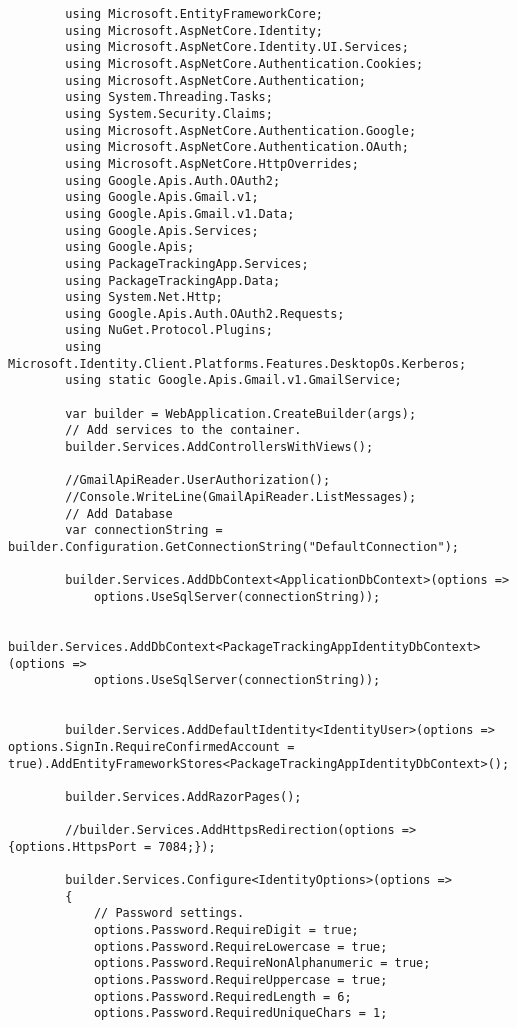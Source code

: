 \begin{verbatim}
        using Microsoft.EntityFrameworkCore;
        using Microsoft.AspNetCore.Identity;
        using Microsoft.AspNetCore.Identity.UI.Services;
        using Microsoft.AspNetCore.Authentication.Cookies;
        using Microsoft.AspNetCore.Authentication;
        using System.Threading.Tasks;
        using System.Security.Claims;
        using Microsoft.AspNetCore.Authentication.Google;
        using Microsoft.AspNetCore.Authentication.OAuth;
        using Microsoft.AspNetCore.HttpOverrides;
        using Google.Apis.Auth.OAuth2;
        using Google.Apis.Gmail.v1;
        using Google.Apis.Gmail.v1.Data;
        using Google.Apis.Services;
        using Google.Apis;
        using PackageTrackingApp.Services;
        using PackageTrackingApp.Data;
        using System.Net.Http;
        using Google.Apis.Auth.OAuth2.Requests;
        using NuGet.Protocol.Plugins;
        using Microsoft.Identity.Client.Platforms.Features.DesktopOs.Kerberos;
        using static Google.Apis.Gmail.v1.GmailService;
        
        var builder = WebApplication.CreateBuilder(args);
        // Add services to the container.
        builder.Services.AddControllersWithViews();
        
        //GmailApiReader.UserAuthorization();
        //Console.WriteLine(GmailApiReader.ListMessages);
        // Add Database 
        var connectionString = builder.Configuration.GetConnectionString("DefaultConnection");
        
        builder.Services.AddDbContext<ApplicationDbContext>(options =>
            options.UseSqlServer(connectionString));
        
        builder.Services.AddDbContext<PackageTrackingAppIdentityDbContext>(options =>
            options.UseSqlServer(connectionString));
        
        
        builder.Services.AddDefaultIdentity<IdentityUser>(options => options.SignIn.RequireConfirmedAccount = true).AddEntityFrameworkStores<PackageTrackingAppIdentityDbContext>();
        
        builder.Services.AddRazorPages();
        
        //builder.Services.AddHttpsRedirection(options => {options.HttpsPort = 7084;});
        
        builder.Services.Configure<IdentityOptions>(options =>
        {
            // Password settings.
            options.Password.RequireDigit = true;
            options.Password.RequireLowercase = true;
            options.Password.RequireNonAlphanumeric = true;
            options.Password.RequireUppercase = true;
            options.Password.RequiredLength = 6;
            options.Password.RequiredUniqueChars = 1;
        

\end{verbatim}
